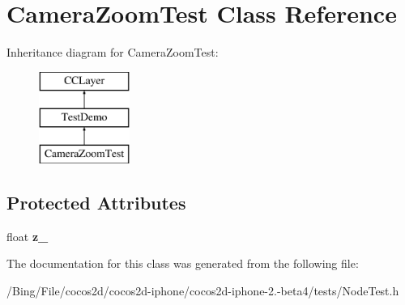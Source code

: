 \hypertarget{interface_camera_zoom_test}{\section{Camera\-Zoom\-Test Class Reference}
\label{interface_camera_zoom_test}
}
Inheritance diagram for Camera\-Zoom\-Test\-:\begin{figure}[H]
\begin{center}
\leavevmode
\includegraphics[height=3.000000cm]{interface_camera_zoom_test}
\end{center}
\end{figure}
\subsection*{Protected Attributes}
\begin{DoxyCompactItemize}
\item 
\hypertarget{interface_camera_zoom_test_abd628399e9083836c85ddcb1f142bc93}{float {\bfseries z\-\_\-}}\label{interface_camera_zoom_test_abd628399e9083836c85ddcb1f142bc93}

\end{DoxyCompactItemize}


The documentation for this class was generated from the following file\-:\begin{DoxyCompactItemize}
\item 
/\-Bing/\-File/cocos2d/cocos2d-\/iphone/cocos2d-\/iphone-\/2.-\/beta4/tests/Node\-Test.\-h\end{DoxyCompactItemize}
